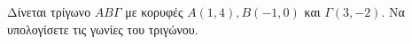 Δίνεται τρίγωνο $ AB\varGamma $ με κορυφές $ A(1,4),B(-1,0) $ και $ \varGamma(3,-2) $. Να υπολογίσετε τις γωνίες του τριγώνου.
